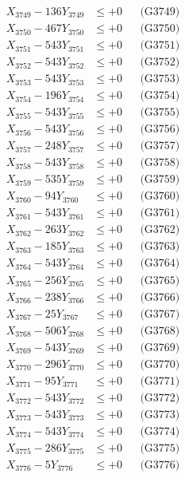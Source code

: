 \documentclass[a4paper,10pt]{article}
\begin{document}
{\begin{align}
X_{3749} - 136Y_{3749} &\leq +0 && \text{(G3749)} \\
X_{3750} - 467Y_{3750} &\leq +0 && \text{(G3750)} \\
\allowbreak
X_{3751} - 543Y_{3751} &\leq +0 && \text{(G3751)} \\
X_{3752} - 543Y_{3752} &\leq +0 && \text{(G3752)} \\
X_{3753} - 543Y_{3753} &\leq +0 && \text{(G3753)} \\
X_{3754} - 196Y_{3754} &\leq +0 && \text{(G3754)} \\
X_{3755} - 543Y_{3755} &\leq +0 && \text{(G3755)} \\
X_{3756} - 543Y_{3756} &\leq +0 && \text{(G3756)} \\
X_{3757} - 248Y_{3757} &\leq +0 && \text{(G3757)} \\
X_{3758} - 543Y_{3758} &\leq +0 && \text{(G3758)} \\
X_{3759} - 535Y_{3759} &\leq +0 && \text{(G3759)} \\
X_{3760} - 94Y_{3760} &\leq +0 && \text{(G3760)} \\
\allowbreak
X_{3761} - 543Y_{3761} &\leq +0 && \text{(G3761)} \\
X_{3762} - 263Y_{3762} &\leq +0 && \text{(G3762)} \\
X_{3763} - 185Y_{3763} &\leq +0 && \text{(G3763)} \\
X_{3764} - 543Y_{3764} &\leq +0 && \text{(G3764)} \\
X_{3765} - 256Y_{3765} &\leq +0 && \text{(G3765)} \\
X_{3766} - 238Y_{3766} &\leq +0 && \text{(G3766)} \\
X_{3767} - 25Y_{3767} &\leq +0 && \text{(G3767)} \\
X_{3768} - 506Y_{3768} &\leq +0 && \text{(G3768)} \\
X_{3769} - 543Y_{3769} &\leq +0 && \text{(G3769)} \\
X_{3770} - 296Y_{3770} &\leq +0 && \text{(G3770)} \\
\allowbreak
X_{3771} - 95Y_{3771} &\leq +0 && \text{(G3771)} \\
X_{3772} - 543Y_{3772} &\leq +0 && \text{(G3772)} \\
X_{3773} - 543Y_{3773} &\leq +0 && \text{(G3773)} \\
X_{3774} - 543Y_{3774} &\leq +0 && \text{(G3774)} \\
X_{3775} - 286Y_{3775} &\leq +0 && \text{(G3775)} \\
X_{3776} - 5Y_{3776} &\leq +0 && \text{(G3776)} \\

\end{align}}
\end{document}
